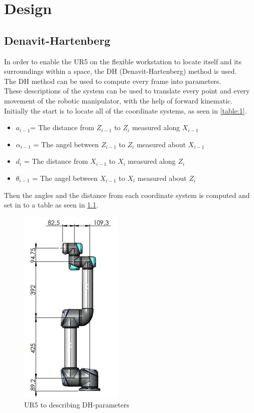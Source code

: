 \chapter{Design}\label{Design}

\section{Denavit-Hartenberg}

In order to enable the UR5 on the flexible workstation to locate itself and its surroundings within a space, the DH (Denavit-Hartenberg) method is used.\\ 
The DH method can be used to compute every frame into parameters.\\
These descriptions of the system can be used to translate every point and every movement of the robotic manipulator, with the help of forward kinematic.\\
Initially the start is to locate all of the coordinate systems, as seen in \ref{table:1}.\\ 


\begin{itemize}
    \item ${a_{i-1}}$= The distance from ${Z_{i-1}}$ to ${Z_{i}}$ measured along ${X_{i-1}}$
    \item ${\alpha_{i-1}}$ = The angel between ${Z_{i-1}}$ to ${Z_{i}}$ measured about ${X_{i-1}}$
    \item ${d_{i}}$ = The distance from ${X_{i-1}}$ to ${X_{i}}$ measured along ${Z_{i}}$
    \item ${\theta_{i-1}}$ = The angel between ${X_{i-1}}$ to ${X_{i}}$ measured about ${Z_{i}}$
\end{itemize}



Then the angles and the distance from each coordinate system is computed and set in to a table as seen in \ref{fig:DH-Table}.

\begin{figure}[h!]
    \centering
    \includegraphics[scale=0.79]{Design/UR5measure.png}
    \caption{UR5 to describing DH-parameters \cite{DH}} 
    \label{fig:DH-Table} 
\end{figure}


